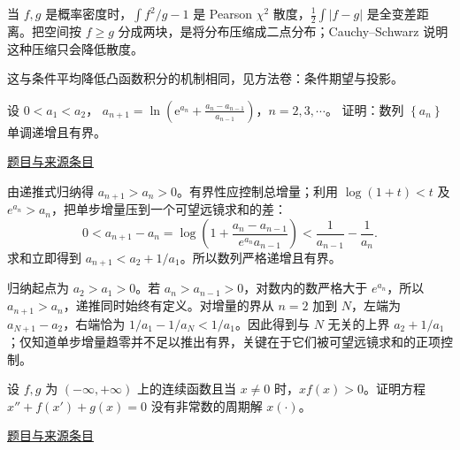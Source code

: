 \documentclass[12pt,fontset=fandol]{ctexart}
\begin{document}
\begin{remark}[方法与条件]当 $f,g$ 是概率密度时，$\int f^2/g-1$ 是 Pearson $\chi^2$ 散度，$\frac12\int|f-g|$ 是全变差距离。把空间按 $f\ge g$ 分成两块，是将分布压缩成二点分布；Cauchy--Schwarz 说明这种压缩只会降低散度。

这与条件平均降低凸函数积分的机制相同，见方法卷：条件期望与投影。\end{remark}

\begin{example}\label{ex:fin15-low:9}\label{pr:fin15-low:9}

设 $0 < a_{1} < a_{2}$，
$a_{n+1} = \ln\left(\mathrm{e}^{a_{n}} + \frac{a_{n} - a_{n-1}}{a_{n-1}}\right)$，$n = 2,3,\cdots$。
证明：数列 $\left\{a_{n}\right\}$ 单调递增且有界。

\par\href{https://github.com/lzxcr/cmc-mathematics/blob/64916fa1fdbc3e444a652eca204d5669058ee321/src/problems/finals/15/10.md}{题目与来源条目}

\end{example}

\begin{solve}\label{ans:fin15-low:9}

由递推式归纳得 $a_{n+1}>a_n>0$。有界性应控制总增量；利用 $\log(1+t)<t$ 及 $e^{a_n}>a_n$，把单步增量压到一个可望远镜求和的差：
\[
0<a_{n+1}-a_n
=\log\left(1+\frac{a_n-a_{n-1}}{e^{a_n}a_{n-1}}\right)
<\frac1{a_{n-1}}-\frac1{a_n}.
\]
求和立即得到 $a_{n+1}<a_2+1/a_1$。所以数列严格递增且有界。

归纳起点为 $a_2>a_1>0$。若 $a_n>a_{n-1}>0$，对数内的数严格大于 $e^{a_n}$，所以 $a_{n+1}>a_n$，递推同时始终有定义。对增量的界从 $n=2$ 加到 $N$，左端为 $a_{N+1}-a_2$，右端恰为 $1/a_1-1/a_N<1/a_1$。因此得到与 $N$ 无关的上界 $a_2+1/a_1$；仅知道单步增量趋零并不足以推出有界，关键在于它们被可望远镜求和的正项控制。

\end{solve}

\begin{example}\label{ex:fin15-low:10}\label{pr:fin15-low:10}

设 $f,g$ 为 $(-\infty,+\infty)$ 上的连续函数且当 $x \neq 0$ 时，$xf(x) > 0$。证明方程 $x'' + f\left(x'\right) + g(x) = 0$ 没有非常数的周期解 $x(\cdot)$。

\par\href{https://github.com/lzxcr/cmc-mathematics/blob/64916fa1fdbc3e444a652eca204d5669058ee321/src/problems/finals/15/12.md}{题目与来源条目}

\end{example}
\end{document}
